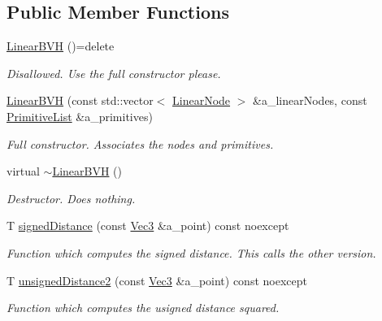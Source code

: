 \subsection*{Public Member Functions}
\begin{DoxyCompactItemize}
\item 
\mbox{\label{classBVH_1_1LinearBVH_af071dcad6741be1314c0b39512d2f142}} 
\hyperlink{classBVH_1_1LinearBVH_af071dcad6741be1314c0b39512d2f142}{Linear\+B\+VH} ()=delete
\begin{DoxyCompactList}\small\item\em Disallowed. Use the full constructor please. \end{DoxyCompactList}\item 
\hyperlink{classBVH_1_1LinearBVH_a82e767c16424e19c5dfbe671dd111e32}{Linear\+B\+VH} (const std\+::vector$<$ \hyperlink{classBVH_1_1LinearBVH_ad8c5e4f84138090dbd408a075dc91896}{Linear\+Node} $>$ \&a\+\_\+linear\+Nodes, const \hyperlink{classBVH_1_1LinearBVH_a94ee5da1670e2ef85eeabf7cf6a2da92}{Primitive\+List} \&a\+\_\+primitives)
\begin{DoxyCompactList}\small\item\em Full constructor. Associates the nodes and primitives. \end{DoxyCompactList}\item 
\mbox{\label{classBVH_1_1LinearBVH_a39a98014b81061b35604422cfab5c9b7}} 
virtual \hyperlink{classBVH_1_1LinearBVH_a39a98014b81061b35604422cfab5c9b7}{$\sim$\+Linear\+B\+VH} ()
\begin{DoxyCompactList}\small\item\em Destructor. Does nothing. \end{DoxyCompactList}\item 
T \hyperlink{classBVH_1_1LinearBVH_a8fb0c0cb9e8f5161ed78953237eb3c39}{signed\+Distance} (const \hyperlink{classBVH_1_1LinearBVH_a13b0083e8b7ff1a5e170d39d69e6a15a}{Vec3} \&a\+\_\+point) const noexcept
\begin{DoxyCompactList}\small\item\em Function which computes the signed distance. This calls the other version. \end{DoxyCompactList}\item 
T \hyperlink{classBVH_1_1LinearBVH_ab8d74df39cb226774c075da7d36eb3f4}{unsigned\+Distance2} (const \hyperlink{classBVH_1_1LinearBVH_a13b0083e8b7ff1a5e170d39d69e6a15a}{Vec3} \&a\+\_\+point) const noexcept
\begin{DoxyCompactList}\small\item\em Function which computes the usigned distance squared. \end{DoxyCompactList}\end{DoxyCompactItemize}
